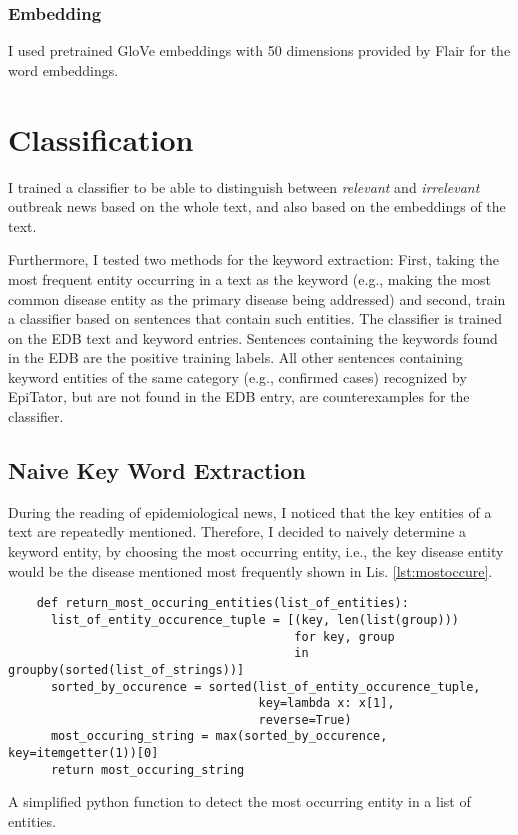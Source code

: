 \subsubsection{Embedding}
I used pretrained GloVe embeddings with 50 dimensions provided by Flair for the word embeddings.

\section{Classification}
I trained a classifier to be able to distinguish between \emph{relevant} and \emph{irrelevant} outbreak news based on the whole text, and also based on the embeddings of the text.

Furthermore, I tested two methods for the keyword extraction: First, taking the most frequent entity occurring in a text as the keyword (e.g., making the most common disease entity as the primary disease being addressed) and second, train a classifier based on sentences that contain such entities. The classifier is trained on the EDB text and keyword entries.
Sentences containing the keywords found in the EDB are the positive training labels.
All other sentences containing keyword entities of the same category (e.g., confirmed cases) recognized by EpiTator, but are not found in the EDB entry, are counterexamples for the classifier.

\subsection{Naive Key Word Extraction}
During the reading of epidemiological news, I noticed that the key entities of a text are repeatedly mentioned. Therefore, I decided to naively determine a keyword entity, by choosing the most occurring entity, i.e., the key disease entity would be the disease mentioned most frequently shown in Lis. \ref{lst:mostoccure}.
\begin{listing}[h!]
  \begin{verbatim}
    def return_most_occuring_entities(list_of_entities):
      list_of_entity_occurence_tuple = [(key, len(list(group)))
                                        for key, group
                                        in groupby(sorted(list_of_strings))]
      sorted_by_occurence = sorted(list_of_entity_occurence_tuple,
                                   key=lambda x: x[1],
                                   reverse=True)
      most_occuring_string = max(sorted_by_occurence, key=itemgetter(1))[0]
      return most_occuring_string
  \end{verbatim}
  \caption{A simplified python function to detect the most occurring entity in a list of entities.}
  \label{lst:mostoccure}
\end{listing}

